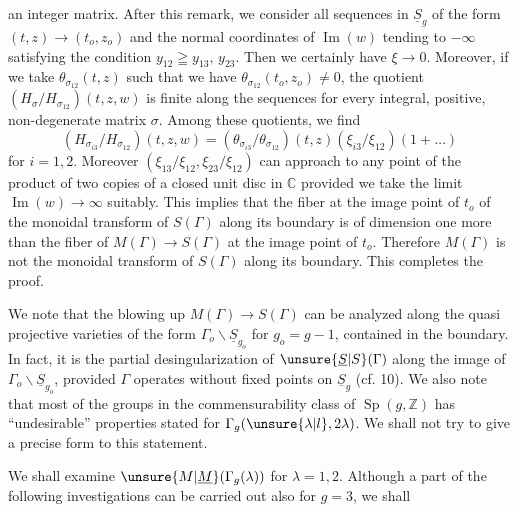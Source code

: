 an integer matrix. After this remark, we consider all sequences in $\underline{S}_{g}$ of the form $(t,z)\longrightarrow(t_{o},z_{o})$ and the normal coordinates of $\operatorname{Im}(w)$ tending to $-\infty$ satisfying the condition $y_{12}\geqq y_{13},\,y_{23}$. Then we certainly have $\xi\longrightarrow0$. Moreover, if we take $\theta_{\sigma_{12}}(t,z)$ such that we have $\theta_{\sigma_{12}}(t_{o},z_{o})\neq0$, the quotient $(H_{\sigma}/H_{\sigma_{12}})(t,z,w)$ is finite along the sequences for every integral, positive, non-degenerate matrix $\sigma$. Among these quotients, we find
\[
(H_{\sigma_{i3}}/H_{\sigma_{12}})(t,z,w)=(\theta_{\sigma_{i3}}/\theta_{\sigma_{12}})(t,z)(\xi_{i3}/\xi_{12})(1+\ldots)
\]
for $i=1,2$. Moreover $(\xi_{13}/\xi_{12},\xi_{23}/\xi_{12})$ can approach to any point of the product of two copies of a closed unit disc in $\mathbb C$ provided we take the limit $\operatorname{Im}(w)\longrightarrow\infty$ suitably. This implies that the fiber at the image point of $t_{o}$ of the monoidal transform of $S(\Gamma)$ along its boundary is of dimension one more than the fiber of $M(\Gamma)\longrightarrow S(\Gamma)$ at the image point of $t_{o}$. Therefore $M(\Gamma)$ is not the monoidal transform of $S(\Gamma)$ along its boundary. This completes the proof.

We note that the blowing up $M(\Gamma)\longrightarrow S(\Gamma)$ can be analyzed along the quasi projective varieties of the form $\Gamma_{o}\backslash\underline S_{g_{o}}$ for $g_{o}=g-1$, contained in the boundary. In fact, it is the partial desingularization of $\unsure{\underline S|S}(\Gamma)$ along the image of $\Gamma_{o}\backslash\underline S_{g_{o}}$, provided $\Gamma$ operates without fixed points on $\underline S_{g}$ (cf. 10). We also note that most of the groups in the commensurability class of $\operatorname{Sp}(g,\mathbb Z)$ has ``undesirable'' properties stated for $\Gamma_{g}(\unsure{\lambda|l},2\lambda)$. We shall not try to give a precise form to this statement.

We shall examine $\unsure{M|\underline M}(\Gamma_{g}(\lambda))$ for $\lambda=1,2$. Although a part of the following investigations can be carried out also for $g=3$, we shall


